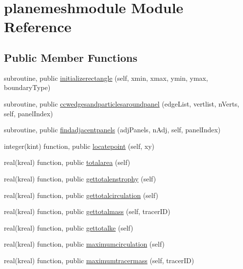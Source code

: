 \hypertarget{classplanemeshmodule}{\section{planemeshmodule Module Reference}
\label{classplanemeshmodule}
}
\subsection*{Public Member Functions}
\begin{DoxyCompactItemize}
\item 
subroutine, public \hyperlink{classplanemeshmodule_a1a6eacd7e67978a3b2a018ca2f6e5dcd}{initializerectangle} (self, xmin, xmax, ymin, ymax, boundary\+Type)
\item 
subroutine, public \hyperlink{classplanemeshmodule_a93f10341dae12deb35cc32fc976191c0}{ccwedgesandparticlesaroundpanel} (edge\+List, vertlist, n\+Verts, self, panel\+Index)
\item 
subroutine, public \hyperlink{classplanemeshmodule_aeed32244605537ac627e003d970a7a39}{findadjacentpanels} (adj\+Panels, n\+Adj, self, panel\+Index)
\item 
integer(kint) function, public \hyperlink{classplanemeshmodule_a1f965d61095f959bce61eb3d9d859dbd}{locatepoint} (self, xy)
\item 
real(kreal) function, public \hyperlink{classplanemeshmodule_a2e328dc9af82d2b705b532df56a528c1}{totalarea} (self)
\item 
real(kreal) function, public \hyperlink{classplanemeshmodule_ae59615dc382b37d49e63179f18d0f1fd}{gettotalenstrophy} (self)
\item 
real(kreal) function, public \hyperlink{classplanemeshmodule_ab1a7aa76744914e7f0ad8b247e4d3e36}{gettotalcirculation} (self)
\item 
real(kreal) function, public \hyperlink{classplanemeshmodule_a4a52887ec259e5d0868b660a2310ee86}{gettotalmass} (self, tracer\+I\+D)
\item 
real(kreal) function, public \hyperlink{classplanemeshmodule_a2154fdcea3b754d6ad2545af3e584085}{gettotalke} (self)
\item 
real(kreal) function, public \hyperlink{classplanemeshmodule_a685a6f6b1f6e4149717762d2511cb5e4}{maximumcirculation} (self)
\item 
real(kreal) function, public \hyperlink{classplanemeshmodule_a8a6d7a5065f1022d8cacdf4e7ef3fb42}{maximumtracermass} (self, tracer\+I\+D)
\item 

\end{DoxyCompactItemize}

